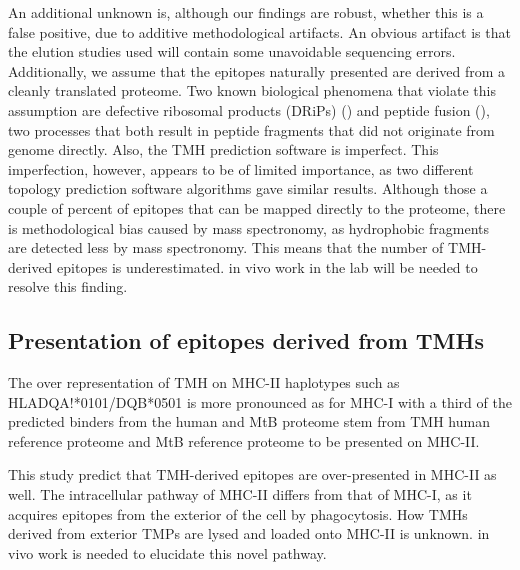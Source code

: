 An additional unknown is, although our findings are robust,
whether this is a false positive,
due to additive methodological artifacts.
An obvious artifact is that the elution studies used 
will contain some unavoidable sequencing errors.
Additionally, we assume that the epitopes naturally presented
are derived from a cleanly translated proteome.
Two known biological phenomena that violate this assumption
are defective ribosomal products (DRiPs) (\cite{yewdell1996defective}) 
and peptide fusion (\cite{delong2016pathogenic}),
two processes that both result in peptide fragments
that did not originate from genome directly.
Also, the TMH prediction software is imperfect.
This imperfection, however, appears to be of limited importance,
as two different topology prediction software algorithms gave similar results.
Although those a couple of percent of epitopes that 
can be mapped directly to the proteome,
there is methodological bias caused by mass spectronomy,
as hydrophobic fragments are detected less 
by mass spectronomy. This means that the number of TMH-derived epitopes
is underestimated.
in vivo work in the lab will be needed to resolve this finding.

\subsection{Presentation of epitopes derived from TMHs}


The over representation of TMH on MHC-II haplotypes such as HLADQA!*0101/DQB*0501 is more pronounced as for MHC-I with a third of the predicted binders from the human and MtB proteome stem from TMH  human reference proteome and MtB reference proteome to be presented on MHC-II.  

This study predict that TMH-derived epitopes are over-presented
in MHC-II as well. 
The intracellular pathway of MHC-II differs from that of MHC-I,
as it acquires epitopes from the exterior of the cell by phagocytosis.
How TMHs derived from exterior TMPs are lysed and loaded onto MHC-II 
is unknown. in vivo work is needed to elucidate this novel pathway.

